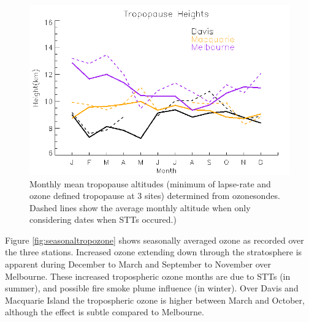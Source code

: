 \documentclass{article}
\begin{document}
    \begin{figure}[!htbp]
	\begin{center}
	\includegraphics[width=0.8\columnwidth]{figures/tpheights}
	\caption{Monthly mean tropopause altitudes (minimum of lapse-rate and ozone defined tropopause at 3 sites) determined from ozonesondes.
	Dashed lines show the average monthly altitude when only considering dates when STTs occured.) 
	}
	\label{fig:seasonaltpheights}
	\end{center}
    \end{figure}

    Figure \ref{fig:seasonaltropozone} shows seasonally averaged ozone as recorded over the three stations.
    Increased ozone extending down through the stratosphere is apparent during December to March and September to November over Melbourne.
    These increased tropospheric ozone months are due to STTs (in summer), and possible fire smoke plume influence (in winter).
    Over Davis and Macquarie Island the tropospheric ozone is higher between March and October, although the effect is subtle compared to Melbourne.
    
\end{document}
